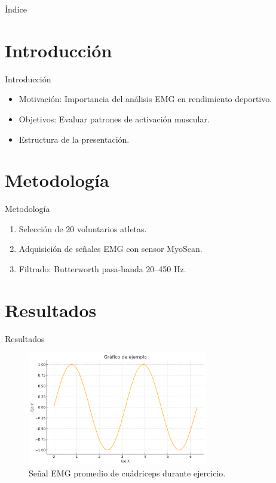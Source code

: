 \documentclass[12pt]{beamer}
\title[\acronimoTrabajo]{\tituloTrabajo}
\subtitle{\cursoNombre}
\author[\autorA \and \autorB]{\autorA \\\autorB}
\institute[]{\carrera\\Docente: \docente}
\date{\fechaEntrega}
\begin{document}
\begin{frame}[plain]
    \titlepage
\end{frame}

\begin{frame}{Índice}
    \tableofcontents
\end{frame}

\section{Introducción}
\begin{frame}{Introducción}
    \begin{itemize}
        \item Motivación: Importancia del análisis EMG en rendimiento deportivo.
        \item Objetivos: Evaluar patrones de activación muscular.
        \item Estructura de la presentación.
    \end{itemize}
\end{frame}

\section{Metodología}
\begin{frame}{Metodología}
    \begin{enumerate}
        \item Selección de 20 voluntarios atletas.
        \item Adquisición de señales EMG con sensor MyoScan.
        \item Filtrado: Butterworth pasa-banda 20–450 Hz.
    \end{enumerate}
\end{frame}

\section{Resultados}
\begin{frame}{Resultados}
    \begin{figure}
        \centering
        \includegraphics[width=0.7\textwidth]{ejemplo_grafico.png}
        \caption{Señal EMG promedio de cuádriceps durante ejercicio.}
    \end{figure}
\end{frame}
\end{document}
